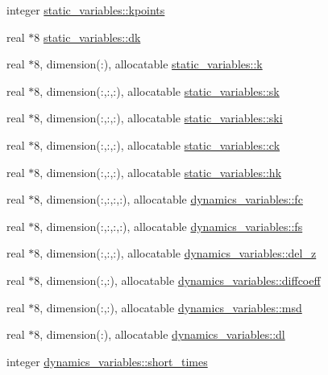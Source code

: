 \begin{DoxyCompactItemize}
integer \hyperlink{namespacestatic__variables_a5d1033bb9fdfdb069bcd5daa750990a6}{static\+\_\+variables\+::kpoints}
\item 
real $\ast$8 \hyperlink{namespacestatic__variables_afb565eaf0e52e61ffb6756641529ecfb}{static\+\_\+variables\+::dk}
\item 
real $\ast$8, dimension(\+:), allocatable \hyperlink{namespacestatic__variables_af88be19e58d424bcd134981f4ecd4e16}{static\+\_\+variables\+::k}
\item 
real $\ast$8, dimension(\+:,\+:,\+:), allocatable \hyperlink{namespacestatic__variables_acf88451b31cf225c9d75dfa81b578d13}{static\+\_\+variables\+::sk}
\item 
real $\ast$8, dimension(\+:,\+:,\+:), allocatable \hyperlink{namespacestatic__variables_a98bc21063e8e3c88bf50664c36f0b1d0}{static\+\_\+variables\+::ski}
\item 
real $\ast$8, dimension(\+:,\+:,\+:), allocatable \hyperlink{namespacestatic__variables_a3fdd9ce6668579419aca846701b9c6f8}{static\+\_\+variables\+::ck}
\item 
real $\ast$8, dimension(\+:,\+:,\+:), allocatable \hyperlink{namespacestatic__variables_a2a3637153de124a5886a991d54b44f25}{static\+\_\+variables\+::hk}
\item 
real $\ast$8, dimension(\+:,\+:,\+:,\+:), allocatable \hyperlink{namespacedynamics__variables_a14b6bfb7fef60f79297bef079ff3abd1}{dynamics\+\_\+variables\+::fc}
\item 
real $\ast$8, dimension(\+:,\+:,\+:,\+:), allocatable \hyperlink{namespacedynamics__variables_a2cd5b8b80f9bebe0e15a0d532d082d5c}{dynamics\+\_\+variables\+::fs}
\item 
real $\ast$8, dimension(\+:,\+:,\+:), allocatable \hyperlink{namespacedynamics__variables_a7fbb51910c646d86285a6bdd809b09f0}{dynamics\+\_\+variables\+::del\+\_\+z}
\item 
real $\ast$8, dimension(\+:,\+:), allocatable \hyperlink{namespacedynamics__variables_a99c20709f211a88c64061031e4fb816f}{dynamics\+\_\+variables\+::diffcoeff}
\item 
real $\ast$8, dimension(\+:,\+:), allocatable \hyperlink{namespacedynamics__variables_a11b1153d883a50528bc1843306c887fe}{dynamics\+\_\+variables\+::msd}
\item 
real $\ast$8, dimension(\+:), allocatable \hyperlink{namespacedynamics__variables_a969e1e44448d09e33d3f8a77ea0dbc6a}{dynamics\+\_\+variables\+::dl}
\item 
integer \hyperlink{namespacedynamics__variables_ae4ed48f39cb51ae5223de16688bf98dc}{dynamics\+\_\+variables\+::short\+\_\+times}

\end{DoxyCompactItemize}

